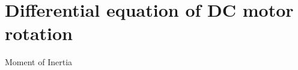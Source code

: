 \documentclass[compress]{beamer}
\begin{document}
\section[Diff. equations]{Differential equation of DC motor rotation}

{
\begin{frame}{Moment of Inertia}
%
%
%
%
%
\end{frame}
}
\end{document}
